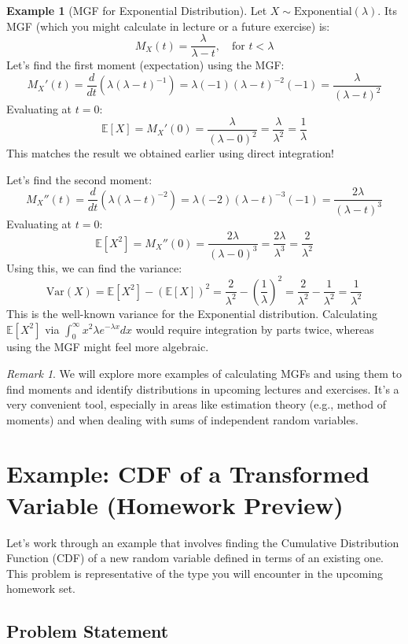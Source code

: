 \documentclass[11pt]{article}
\theoremstyle{definition}
\newtheorem{example}[theorem]{Example}
\theoremstyle{remark}
\newtheorem{remark}[theorem]{Remark}
\newcommand{\E}{\mathbb{E}}
\newcommand{\Var}{\text{Var}}
\begin{document}
\begin{example}[MGF for Exponential Distribution]
Let $X \sim \text{Exponential}(\lambda)$. Its MGF (which you might calculate in lecture or a future exercise) is:
\[ M_X(t) = \frac{\lambda}{\lambda - t}, \quad \text{for } t < \lambda \]
Let's find the first moment (expectation) using the MGF:
\[ M_X'(t) = \frac{d}{dt} (\lambda (\lambda - t)^{-1}) = \lambda (-1) (\lambda - t)^{-2} (-1) = \frac{\lambda}{(\lambda - t)^2} \]
Evaluating at $t=0$:
\[ \E[X] = M_X'(0) = \frac{\lambda}{(\lambda - 0)^2} = \frac{\lambda}{\lambda^2} = \frac{1}{\lambda} \]
This matches the result we obtained earlier using direct integration!

Let's find the second moment:
\[ M_X''(t) = \frac{d}{dt} (\lambda (\lambda - t)^{-2}) = \lambda (-2) (\lambda - t)^{-3} (-1) = \frac{2\lambda}{(\lambda - t)^3} \]
Evaluating at $t=0$:
\[ \E[X^2] = M_X''(0) = \frac{2\lambda}{(\lambda - 0)^3} = \frac{2\lambda}{\lambda^3} = \frac{2}{\lambda^2} \]
Using this, we can find the variance:
\[ \Var(X) = \E[X^2] - (\E[X])^2 = \frac{2}{\lambda^2} - \left(\frac{1}{\lambda}\right)^2 = \frac{2}{\lambda^2} - \frac{1}{\lambda^2} = \frac{1}{\lambda^2} \]
This is the well-known variance for the Exponential distribution. Calculating $\E[X^2]$ via $\int_0^\infty x^2 \lambda e^{-\lambda x} dx$ would require integration by parts twice, whereas using the MGF might feel more algebraic.
\end{example}

\begin{remark}
We will explore more examples of calculating MGFs and using them to find moments and identify distributions in upcoming lectures and exercises. It's a very convenient tool, especially in areas like estimation theory (e.g., method of moments) and when dealing with sums of independent random variables.
\end{remark}


\section{Example: CDF of a Transformed Variable (Homework Preview)}

Let's work through an example that involves finding the Cumulative Distribution Function (CDF) of a new random variable defined in terms of an existing one. This problem is representative of the type you will encounter in the upcoming homework set.

\subsection{Problem Statement}
\end{document}

